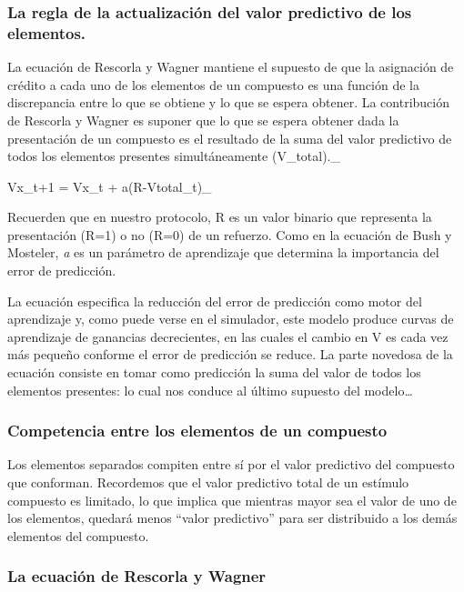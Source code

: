 \documentclass[
  a4paper,
  DIV=11,
  numbers=noendperiod]{scrreprt}
\begin{document}
\subsubsection{La regla de la actualización del valor predictivo de los
elementos.}\label{la-regla-de-la-actualizaciuxf3n-del-valor-predictivo-de-los-elementos.}

La ecuación de Rescorla y Wagner mantiene el supuesto de que la
asignación de crédito a cada uno de los elementos de un compuesto es una
función de la discrepancia entre lo que se obtiene y lo que se espera
obtener. La contribución de Rescorla y Wagner es suponer que lo que se
espera obtener dada la presentación de un compuesto es el resultado de
la suma del valor predictivo de todos los elementos presentes
simultáneamente (V\_total).\_

Vx\_t+1 = Vx\_t + a(R-Vtotal\_t)\_

Recuerden que en nuestro protocolo, R es un valor binario que representa
la presentación (R=1) o no (R=0) de un refuerzo. Como en la ecuación de
Bush y Mosteler, \emph{a} es un parámetro de aprendizaje que determina
la importancia del error de predicción.

La ecuación especifica la reducción del error de predicción como motor
del aprendizaje y, como puede verse en el simulador, este modelo produce
curvas de aprendizaje de ganancias decrecientes, en las cuales el cambio
en V es cada vez más pequeño conforme el error de predicción se reduce.
La parte novedosa de la ecuación consiste en tomar como predicción la
suma del valor de todos los elementos presentes: lo cual nos conduce al
último supuesto del modelo\ldots{}

\subsubsection{Competencia entre los elementos de un
compuesto}\label{competencia-entre-los-elementos-de-un-compuesto}

Los elementos separados compiten entre sí por el valor predictivo del
compuesto que conforman. Recordemos que el valor predictivo total de un
estímulo compuesto es limitado, lo que implica que mientras mayor sea el
valor de uno de los elementos, quedará menos ``valor predictivo'' para
ser distribuido a los demás elementos del compuesto.

\subsubsection{La ecuación de Rescorla y
Wagner}\label{la-ecuaciuxf3n-de-rescorla-y-wagner}
\end{document}
